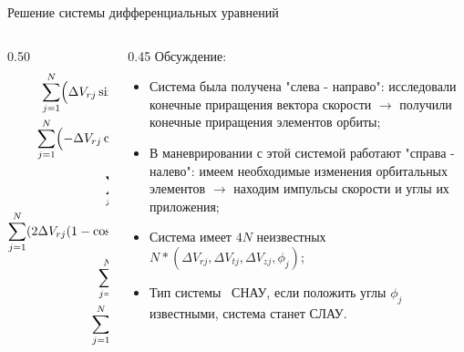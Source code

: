 \documentclass[9pt]{beamer}
\begin{document}
\begin{frame}{Решение системы дифференциальных уравнений}
\begin{columns}[T,onlytextwidth]
  \begin{column}{0.50\textwidth}
    \begin{gather*}
        \sum_{j=1}^{N} \Bigl( \Delta V_{rj} \sin \phi_j + 2 \Delta V_{tj} \cos \phi_j \Bigl) = V_0 \Delta e_x, \\
        \sum_{j=1}^{N} \Bigl( -\Delta V_{rj} \cos \phi_j + 2 \Delta V_{tj} \sin \phi_j \Bigl) = V_0 \Delta e_y, \\
        \sum_{j=1}^{N} 2 \Delta V_{tj} = V_0 \Delta a, \\
        \sum_{j=1}^{N} (2 \Delta V_{rj} (1 - \cos \phi_j) + \Delta V_{tj} (-3 \phi_j + 4 \sin \phi_j)) = \Delta t, \\
        \sum_{j=1}^{N} -\Delta V_{zj} \sin \phi_j = 0, \\
        \sum_{j=1}^{N} \Delta V_{zj} \cos \phi_j = V_0 \Delta i.
    \end{gather*}
  \end{column}

  \begin{column}{0.45\textwidth}
    Обсуждение:
    \begin{itemize}
        \item Система была получена "слева - направо": исследовали конечные приращения вектора скорости $\longrightarrow$ получили конечные приращения элементов орбиты;
        \item В маневрировании с этой системой работают "справа - налево": имеем необходимые изменения орбитальных элементов $\longrightarrow$ находим импульсы скорости и углы их приложения;
        \item Система имеет $4N$ неизвестных \textemdash\ $N * (\Delta V_{rj}, \Delta V_{tj}, \Delta V_{zj}, \phi_j)$;
        \item Тип системы \textemdash\ СНАУ, если положить углы $\phi_j$ известными, система станет СЛАУ.
    \end{itemize}
  \end{column}
\end{columns}

\end{frame}
\end{document}
